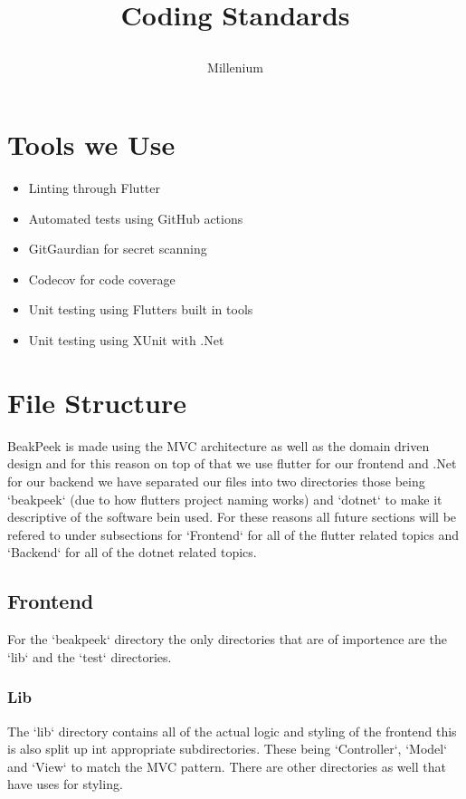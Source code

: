 \documentclass{article}
\title{

\\
{Coding Standards}
}
\author{Millenium}
\begin{document}
\tableofcontents

\newpage

\section{Tools we Use}

\begin{itemize}
    \item Linting through Flutter
    \item Automated tests using GitHub actions
    \item GitGaurdian for secret scanning
    \item Codecov for code coverage
    \item Unit testing using Flutters built in tools
    \item Unit testing using XUnit with .Net
\end{itemize}

\section{File Structure}

BeakPeek is made using the MVC architecture as well as the domain driven design and for this reason on 
top of that we use flutter for our frontend and .Net for our backend we have separated our files 
into two directories those being `beakpeek` (due to how flutters project naming works) and `dotnet`
to make it descriptive of the software bein used. For these reasons all future sections will be refered
to under subsections for `Frontend` for all of the flutter related topics and `Backend` for all of the 
dotnet related topics.

\subsection{Frontend}

For the `beakpeek` directory the only directories that are of importence are the `lib` and the `test` 
directories.

\subsubsection{Lib}
The `lib` directory contains all of the actual logic and styling of the frontend this is also split up
int appropriate subdirectories. These being `Controller`, `Model` and `View` to match the MVC pattern. 
There are other directories as well that have uses for styling.
\end{document}
